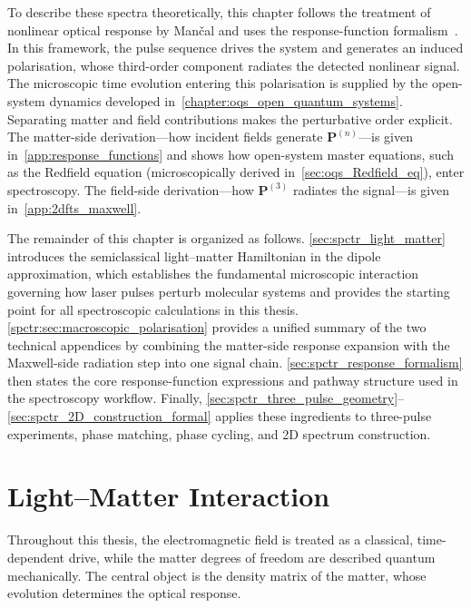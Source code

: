 To describe these spectra theoretically, this chapter follows the treatment of nonlinear optical response by Mančal and uses the response-function formalism~\cite{mancal2022nonlinearopticalspectroscopy}. In this framework, the pulse sequence drives the system and generates an induced polarisation, whose third-order component radiates the detected nonlinear signal. The microscopic time evolution entering this polarisation is supplied by the open-system dynamics developed in~\autoref{chapter:oqs_open_quantum_systems}. Separating matter and field contributions makes the perturbative order explicit.
The matter-side derivation---how incident fields generate $\boldsymbol{P}^{(n)}$---is given in~\autoref{app:response_functions} and shows how open-system master equations, such as the Redfield equation (microscopically derived in~\autoref{sec:oqs_Redfield_eq}), enter spectroscopy.
The field-side derivation---how $\boldsymbol{P}^{(3)}$ radiates the signal---is given in~\autoref{app:2dfts_maxwell}.

The remainder of this chapter is organized as follows.
\autoref{sec:spctr_light_matter} introduces the semiclassical light--matter Hamiltonian in the dipole approximation, which establishes the fundamental microscopic interaction governing how laser pulses perturb molecular systems and provides the starting point for all spectroscopic calculations in this thesis.
\autoref{spctr:sec:macroscopic_polarisation} provides a unified summary of the two technical appendices by combining the matter-side response expansion with the Maxwell-side radiation step into one signal chain.
\autoref{sec:spctr_response_formalism} then states the core response-function expressions and pathway structure used in the spectroscopy workflow.
Finally, \autoref{sec:spctr_three_pulse_geometry}--\autoref{sec:spctr_2D_construction_formal} applies these ingredients to three-pulse experiments, phase matching, phase cycling, and 2D spectrum construction.

\section{Light--Matter Interaction}
\label{sec:spctr_light_matter}
Throughout this thesis, the electromagnetic field is treated as a classical, time-dependent drive, while the matter degrees of freedom are described quantum mechanically.
The central object is the density matrix of the matter, whose evolution determines the optical response.

